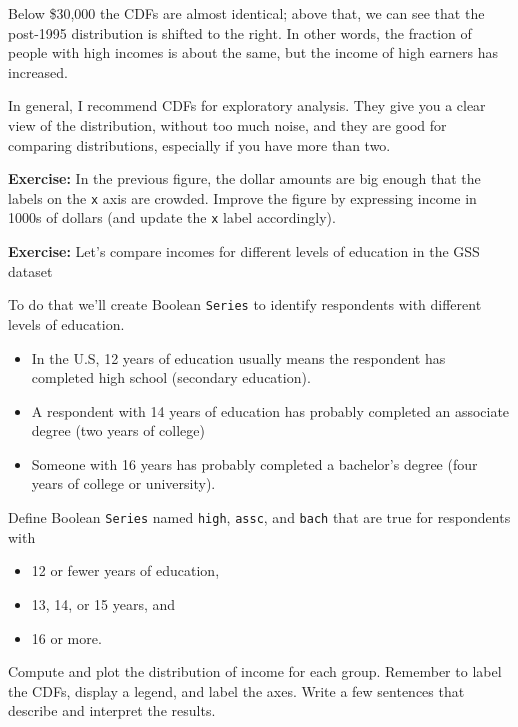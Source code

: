 Below \$30,000 the CDFs are almost identical; above that, we can see
that the post-1995 distribution is shifted to the right. In other words,
the fraction of people with high incomes is about the same, but the
income of high earners has increased.

In general, I recommend CDFs for exploratory analysis. They give you a
clear view of the distribution, without too much noise, and they are
good for comparing distributions, especially if you have more than two.

\textbf{Exercise:} In the previous figure, the dollar amounts are big
enough that the labels on the \passthrough{\lstinline!x!} axis are
crowded. Improve the figure by expressing income in 1000s of dollars
(and update the \passthrough{\lstinline!x!} label accordingly).

\textbf{Exercise:} Let's compare incomes for different levels of
education in the GSS dataset

To do that we'll create Boolean \passthrough{\lstinline!Series!} to
identify respondents with different levels of education.

\begin{itemize}
\item
  In the U.S, 12 years of education usually means the respondent has
  completed high school (secondary education).
\item
  A respondent with 14 years of education has probably completed an
  associate degree (two years of college)
\item
  Someone with 16 years has probably completed a bachelor's degree (four
  years of college or university).
\end{itemize}

Define Boolean \passthrough{\lstinline!Series!} named
\passthrough{\lstinline!high!}, \passthrough{\lstinline!assc!}, and
\passthrough{\lstinline!bach!} that are true for respondents with

\begin{itemize}
\item
  12 or fewer years of education,
\item
  13, 14, or 15 years, and
\item
  16 or more.
\end{itemize}

Compute and plot the distribution of income for each group. Remember to
label the CDFs, display a legend, and label the axes. Write a few
sentences that describe and interpret the results.

